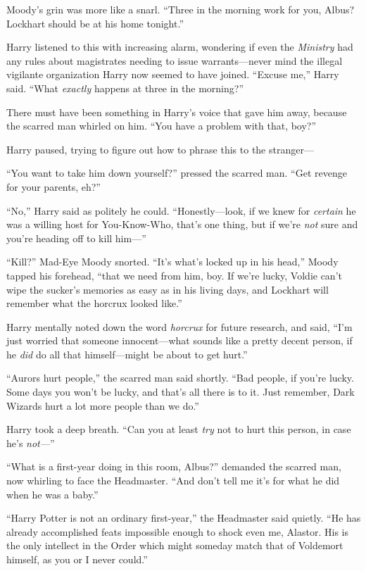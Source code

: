 Moody’s grin was more like a snarl. “Three in the morning work for you, Albus? Lockhart should be at his home tonight.”

Harry listened to this with increasing alarm, wondering if even the \emph{Ministry} had any rules about magistrates needing to issue warrants—never mind the illegal vigilante organization Harry now seemed to have joined. “Excuse me,” Harry said. “What \emph{exactly} happens at three in the morning?”

There must have been something in Harry’s voice that gave him away, because the scarred man whirled on him. “You have a problem with that, boy?”

Harry paused, trying to figure out how to phrase this to the stranger—

“You want to take him down yourself?” pressed the scarred man. “Get revenge for your parents, eh?”

“No,” Harry said as politely he could. “Honestly—look, if we knew for \emph{certain} he was a willing host for You-Know-Who, that’s one thing, but if we’re \emph{not} sure and you’re heading off to kill him—”

“Kill?” Mad-Eye Moody snorted. “It’s what’s locked up in his head,” Moody tapped his forehead, “that we need from him, boy. If we’re lucky, Voldie can’t wipe the sucker’s memories as easy as in his living days, and Lockhart will remember what the horcrux looked like.”

Harry mentally noted down the word \emph{horcrux} for future research, and said, “I’m just worried that someone innocent—what sounds like a pretty decent person, if he \emph{did} do all that himself—might be about to get hurt.”

“Aurors hurt people,” the scarred man said shortly. “Bad people, if you’re lucky. Some days you won’t be lucky, and that’s all there is to it. Just remember, Dark Wizards hurt a lot more people than we do.”

Harry took a deep breath. “Can you at least \emph{try} not to hurt this person, in case he’s \emph{not—}”

“What is a first-year doing in this room, Albus?” demanded the scarred man, now whirling to face the Headmaster. “And don’t tell me it’s for what he did when he was a baby.”

“Harry Potter is not an ordinary first-year,” the Headmaster said quietly. “He has already accomplished feats impossible enough to shock even me, Alastor. His is the only intellect in the Order which might someday match that of Voldemort himself, as you or I never could.”

